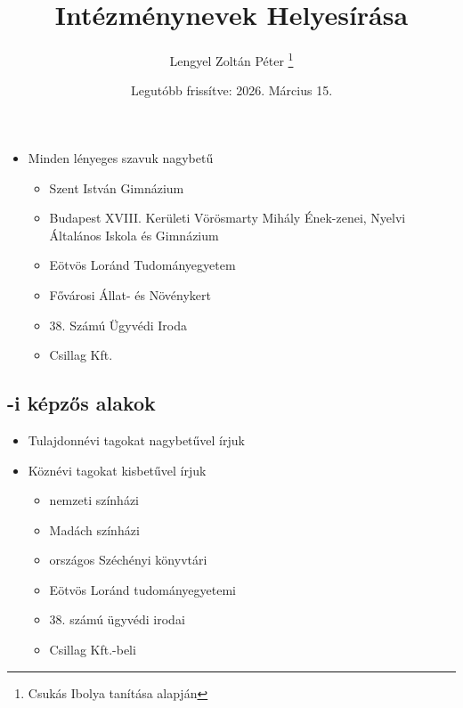 \documentclass{article}
\title{Intézménynevek Helyesírása}
\author{Lengyel Zoltán Péter \thanks{Csukás Ibolya tanítása alapján}}
\date{Legutóbb frissítve: 2026. Március 15.}
\begin{document}
\maketitle

\begin{itemize}
    \item Minden lényeges szavuk nagybetű
    \begin{itemize}
        \item Szent István Gimnázium
        \item Budapest XVIII. Kerületi Vörösmarty Mihály Ének-zenei, Nyelvi Általános Iskola és Gimnázium
        \item Eötvös Loránd Tudományegyetem
        \item Fővárosi Állat- és Növénykert
        \item 38. Számú Ügyvédi Iroda
        \item Csillag Kft.
    \end{itemize}
\end{itemize}
\subsection{-i képzős alakok}
\begin{itemize}
    \item Tulajdonnévi tagokat nagybetűvel írjuk
    \item Köznévi tagokat kisbetűvel írjuk
    \begin{itemize}
        \item nemzeti színházi
        \item Madách színházi
        \item országos Széchényi könyvtári
        \item Eötvös Loránd tudományegyetemi
        \item  38. számú ügyvédi irodai
        \item Csillag Kft.-beli
    \end{itemize}
\end{itemize}
\end{document}
